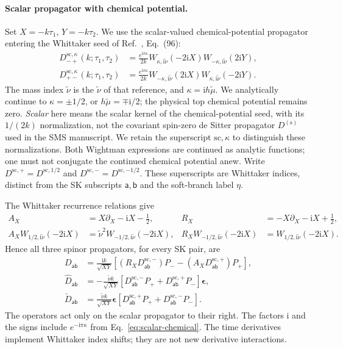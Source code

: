 \documentclass[a4paper,12pt]{article}
\newcommand{\ii}{\mathrm i}
\newcommand{\tn}{\tilde\nu}
\def\aa{\mathsf a}
\newcommand{\bb}{\mathsf b}
\newcommand{\Dsc}[1]{D^{\mathrm{sc},#1}}
\newcommand{\epsmat}{\boldsymbol{\epsilon}}
\begin{document}
\paragraph{Scalar propagator with chemical potential.}
Set $X=-k\tau_1$, $Y=-k\tau_2$. We use the scalar-valued
chemical-potential propagator entering the Whittaker seed of
Ref.~\cite{qin-seed}, Eq.~(96):
\begin{align}
 \Dsc{\kappa}_{-+}(k;\tau_1,\tau_2)
 &=\frac{e^{\ii\pi\kappa}}{2k}
 W_{\kappa,\ii\tn}(-2\ii X)W_{-\kappa,\ii\tn}(2\ii Y),\nonumber\\
 \Dsc{\kappa}_{+-}(k;\tau_1,\tau_2)
 &=\frac{e^{\ii\pi\kappa}}{2k}
 W_{-\kappa,\ii\tn}(2\ii X)W_{\kappa,\ii\tn}(-2\ii Y).
 \label{eq:scalar-chemical}
\end{align}
The mass index $\tn$ is the $\widetilde\nu$ of that reference, and
$\kappa=\ii h\widetilde\mu$. We analytically continue to
$\kappa=\pm1/2$, or $h\widetilde\mu=\mp\ii/2$; the physical top
chemical potential remains zero. \emph{Scalar} here means the scalar
kernel of the chemical-potential seed, with its $1/(2k)$ normalization,
not the covariant spin-zero de Sitter propagator $D^{\mathrm{(s)}}$
used in the SMS manuscript. We retain the superscript
$\mathrm{sc},\kappa$ to distinguish these normalizations.
Both Wightman expressions are continued as analytic functions;
one must not conjugate the continued chemical potential anew.
Write $\Dsc{+}=\Dsc{1/2}$ and $\Dsc{-}=\Dsc{-1/2}$.
These superscripts are Whittaker indices, distinct from the SK
subscripts $\aa,\bb$ and the soft-branch label $\eta$.

The Whittaker recurrence relations give
\begin{align}
 A_X&=X\partial_X-\ii X-\tfrac12,&
 R_X&=-X\partial_X-\ii X+\tfrac12,\nonumber\\
 A_XW_{1/2,\ii\tn}(-2\ii X)
 &=\tn^2W_{-1/2,\ii\tn}(-2\ii X),&
 R_XW_{-1/2,\ii\tn}(-2\ii X)
 &=W_{1/2,\ii\tn}(-2\ii X).
 \label{eq:whittaker-operators}
\end{align}
Hence all three spinor propagators, for every SK pair, are
\begin{align}
 D_{\aa\bb}
 &=\frac{\ii k}{\sqrt{XY}}\left[
 (R_X\Dsc{-}_{\aa\bb})P_--(A_X\Dsc{+}_{\aa\bb})P_+\right],
 \label{eq:normal-scalar}\\
 \widehat D_{\aa\bb}
 &=-\frac{\tn k}{\sqrt{XY}}
 \left[\Dsc{-}_{\aa\bb}P_++\Dsc{+}_{\aa\bb}P_-\right]\epsmat,
 \label{eq:anomalous-scalar}\\
 \check D_{\aa\bb}
 &=\frac{\tn k}{\sqrt{XY}}\epsmat
 \left[\Dsc{+}_{\aa\bb}P_++\Dsc{-}_{\aa\bb}P_-\right].
 \label{eq:conjugate-scalar}
\end{align}
The operators act only on the scalar propagator to their right.
The factors $\ii$ and the signs include $e^{-\ii\pi\kappa}$ from
Eq.~\eqref{eq:scalar-chemical}. The time derivatives implement
Whittaker index shifts; they are not new derivative interactions.
\end{document}
